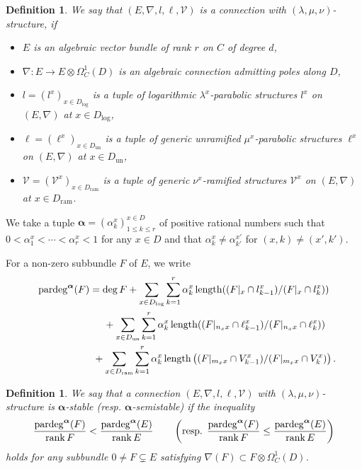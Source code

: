 \documentclass[pdftex]{sigma}
\numberwithin{equation}{section}
\newtheorem{Definition}[Theorem]{Definition}
\newcommand\rank{\mathop{\rm rank}\nolimits}
\newcommand{\length}{\mathop{\rm length}\nolimits}
\newcommand{\balpha}{\boldsymbol \alpha}
\begin{document}
\begin{Definition}
\rm
We say that $(E,\nabla,l,\ell,{\mathcal V})$
is a connection with $(\lambda,\mu,\nu)$-structure, if
\begin{itemize}\itemsep=0pt
\item[(i)]
$E$ is an algebraic vector bundle of rank $r$ on $C$ of degree $d$,
\item[(ii)]
$\nabla\colon E \longrightarrow E\otimes \Omega^1_C(D)$
is an algebraic connection admitting poles along $D$,
\item[(iii)] $l=(l^x)_{x\in D_{\mathrm{log}}}$ is a tuple of
logarithmic $\lambda^x$-parabolic structures
$l^x$ on $(E,\nabla)$ at $x\in D_{\mathrm{log}}$,
\item[(iii)]
$\ell=(\ell^x)_{x\in D_{\mathrm{un}}}$ is a tuple of generic unramified
$\mu^x$-parabolic structures $\ell^x$ on $(E,\nabla)$ at $x\in D_{\mathrm{un}}$,
\item[(iv)]
${\mathcal V}=({\mathcal V}^x)_{x\in D_{\mathrm{ram}}}$
is a tuple of generic
$\nu^x$-ramified structures ${\mathcal V}^x$ on $(E,\nabla)$
at $x\in D_{\mathrm{ram}}$.
\end{itemize}
\end{Definition}




We take a tuple
$\balpha=\left( \alpha^x_k \right)^{x\in D}_{1\leq k\leq r} $
of positive rational numbers such that
$0<\alpha^x_1<\cdots<\alpha^x_r<1$ for any $x\in D$
and that
$\alpha^x_k\neq\alpha^{x'}_{k'}$ for $(x,k)\neq(x',k')$.

For a non-zero subbundle $F$ of $E$, we write
\begin{gather*}
 \mathrm{pardeg}^{\balpha}(F)=
 \deg F+\sum_{x\in D_{\mathrm{log}}}\sum_{k=1}^r
 \alpha^x_k \length((F|_{x}\cap l^x_{k-1})/(F|_{x}\cap l^x_k))
 \\
\hphantom{\mathrm{pardeg}^{\balpha}(F)=}{}
 + \sum_{x\in D_{\mathrm{un}}}\sum_{k=1}^r
 \alpha^x_k \length ( (F|_{n_x x}\cap \ell^x_{k-1}) / (F|_{n_xx}\cap \ell^x_k) )
 \\
\hphantom{\mathrm{pardeg}^{\balpha}(F)=}{}
 +\sum_{x\in D_{\mathrm{ram}}}\sum_{k=1}^r
 \alpha^x_k\length \left( (F|_{m_xx}\cap V^x_{k-1})/(F|_{m_xx}\cap V^x_k)\right).
\end{gather*}

\begin{Definition} \label{definition: stability}
We say that a connection
$(E,\nabla,l,\ell,{\mathcal V})$ with $(\lambda,\mu,\nu)$-structure
is $\balpha$-stable (resp. $\balpha$-semistable) if
the inequality
\begin{equation*}
 \frac { \mathrm{pardeg}^{\balpha}(F) }
 {\rank F}
 <
 \frac { \mathrm{pardeg}^{\balpha}(E) }
 {\rank E}
 \qquad
 \left( \text{resp. }
 \frac { \mathrm{pardeg}^{\balpha}(F) }
 {\rank F}
 \leq
 \frac { \mathrm{pardeg}^{\balpha}(E) }
 {\rank E} \right)
\end{equation*}
holds for any subbundle $0\neq F\subsetneq E$ satisfying
$\nabla(F)\subset F\otimes\Omega^1_C(D)$.
\end{Definition}
\end{document}
